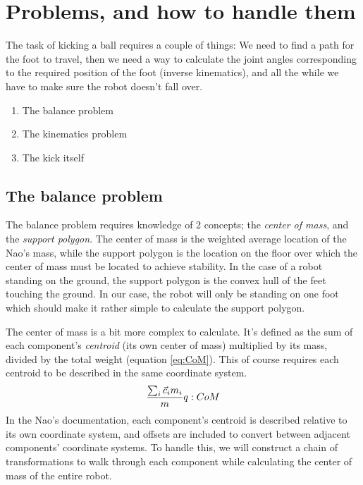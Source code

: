 \documentclass[a4paper]{article}
\begin{document}
\section{Problems, and how to handle them}
The task of kicking a ball requires a couple of things: We need to find a path for the foot to travel, then we need a way to calculate the joint angles corresponding to the required position of the foot (inverse kinematics), and all the while we have to make sure the robot doesn’t fall over.

\begin{enumerate}
  \item The balance problem
  \item The kinematics problem
  \item The kick itself
\end{enumerate}

\subsection{The balance problem}
The balance problem requires knowledge of 2 concepts; the \emph{center of mass}, and the \emph{support polygon}. The center of mass is the weighted average location of the Nao’s mass, while the support polygon is the location on the floor over which the center of mass must be located to achieve stability. In the case of a robot standing on the ground, the support polygon is the convex hull of the feet touching the ground. In our case, the robot will only be standing on one foot which should make it rather simple to calculate the support polygon. 

The center of mass is a bit more complex to calculate. It’s defined as the sum of each component’s \emph{centroid} (its own center of mass) multiplied by its mass, divided by the total weight (equation \ref{eq:CoM}). This of course requires each centroid to be described in the same coordinate system.
\begin{align}
  \frac{\sum_i \vec{c}_i m_i} {m}        \label eq:CoM
\end{align}
In the Nao’s documentation, each component’s centroid is described relative to its own coordinate system, and offsets are included to convert between adjacent components’ coordinate systems. To handle this, we will construct a chain of transformations to walk through each component while calculating the center of mass of the entire robot.
\end{document}
